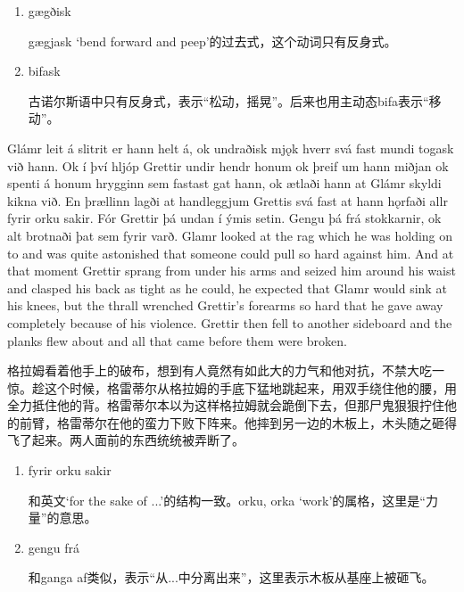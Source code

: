 \begin{grammar*}{}
  \begin{enumerate}[leftmargin=*]
    \item gægðisk

          gægjask `bend forward and peep'的过去式，这个动词只有反身式。

    \item bifask

          古诺尔斯语中只有反身式，表示“松动，摇晃”。后来也用主动态bifa表示“移动”。
  \end{enumerate}
\end{grammar*}
\begin{paracol}{2}
  Glámr leit á slitrit er hann helt á, ok undraðisk mjǫk hverr svá fast mundi togask við hann. Ok í því hljóp Grettir undir hendr honum ok þreif um hann miðjan ok spenti á honum hrygginn sem fastast gat hann, ok ætlaði hann at Glámr skyldi kikna við. En þrællinn lagði at handleggjum Grettis svá fast at hann hǫrfaði allr fyrir orku sakir. Fór Grettir þá undan í ýmis setin. Gengu þá frá stokkarnir, ok alt brotnaði þat sem fyrir varð.
  \switchcolumn
  Glamr looked at the rag which he was holding on to and was quite astonished that someone could pull so hard against him. And at that moment Grettir sprang from under his arms and seized him around his waist and clasped his back as tight as he could, he expected that Glamr would sink at his knees, but the thrall wrenched Grettir's forearms so hard that he gave away completely because of his violence. Grettir then fell to another sideboard and the planks flew about and all that came before them were broken.
\end{paracol}
\begin{translation*}{}
  格拉姆看着他手上的破布，想到有人竟然有如此大的力气和他对抗，不禁大吃一惊。趁这个时候，格雷蒂尔从格拉姆的手底下猛地跳起来，用双手绕住他的腰，用全力抵住他的背。格雷蒂尔本以为这样格拉姆就会跪倒下去，但那尸鬼狠狠拧住他的前臂，格雷蒂尔在他的蛮力下败下阵来。他摔到另一边的木板上，木头随之砸得飞了起来。两人面前的东西统统被弄断了。
\end{translation*}
\begin{grammar*}{}
  \begin{enumerate}[leftmargin=*]
    \item fyrir orku sakir

          和英文`for the sake of ...'的结构一致。orku, orka `work'的属格，这里是“力量”的意思。

    \item gengu frá

          和ganga af类似，表示“从...中分离出来”，这里表示木板从基座上被砸飞。
  \end{enumerate}
\end{grammar*}
